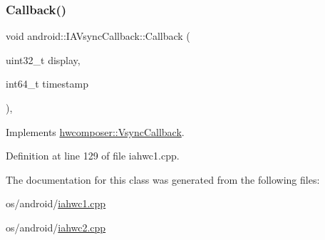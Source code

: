 \subsubsection{\texorpdfstring{Callback()}{Callback()}\hspace{0.1cm}{\footnotesize\ttfamily [2/2]}}
{\footnotesize\ttfamily void android\+::\+I\+A\+Vsync\+Callback\+::\+Callback (\begin{DoxyParamCaption}\item[{uint32\+\_\+t}]{display,  }\item[{int64\+\_\+t}]{timestamp }\end{DoxyParamCaption})\hspace{0.3cm}{\ttfamily [inline]}, {\ttfamily [virtual]}}



Implements \mbox{\hyperlink{classhwcomposer_1_1VsyncCallback_a632ac6a2e13e1b387df9508507a2ed4d}{hwcomposer\+::\+Vsync\+Callback}}.



Definition at line 129 of file iahwc1.\+cpp.


\begin{DoxyCode}{0}
\end{DoxyCode}


The documentation for this class was generated from the following files\+:\begin{DoxyCompactItemize}
\item 
os/android/\mbox{\hyperlink{iahwc1_8cpp}{iahwc1.\+cpp}}\item 
os/android/\mbox{\hyperlink{iahwc2_8cpp}{iahwc2.\+cpp}}\end{DoxyCompactItemize}
